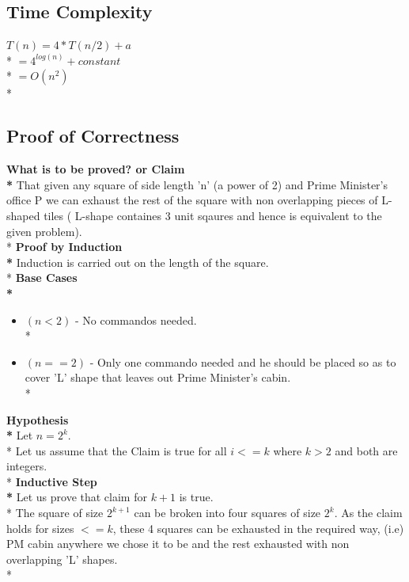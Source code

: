 \documentclass{article}
\begin{document}
\begin{itemize}
\subsection{Time Complexity}
\begin{center}
$ T(n) = 4*T(n/2) + a $ \\*
$ = 4^{log(n)} + constant $ \\*
$ = O(n^2) $ \\*
\end{center}
\subsection{Proof of Correctness}
{\bf What is to be proved? or Claim \\*}
That given any square of side length 'n' (a power of 2)  and Prime Minister's office P we can exhaust the rest of the square with non overlapping pieces of L-shaped tiles ( L-shape containes 3 unit sqaures and hence is equivalent to the given problem).  \\*
{\bf Proof by Induction \\*}
Induction is carried out on the length of the square. \\*
{\bf Base Cases \\*}
\begin{itemize}
\item $(n<2)$ - No commandos needed. \\*
\item $(n==2)$ - Only one commando needed and he should be placed so as to cover 'L' shape that leaves out Prime Minister's cabin. \\*
\end{itemize}
{\bf Hypothesis \\*}
Let $ n = 2^{k} $. \\*
Let us assume that the Claim is true for all $i<=k$ where $k>2$ and both are integers. \\*
{\bf Inductive Step \\*}
Let us prove that claim for $ k+1 $ is true. \\*
The square of size $2^{k+1}$ can be broken into four squares of size $2^{k}$. As the claim holds for sizes $<=k$, these 4 squares can be exhausted in the required way, (i.e) PM cabin anywhere we chose it to be and the rest exhausted with non overlapping 'L' shapes. \\*
\begin{center}
\end{center}
\end{itemize}
\end{document}

